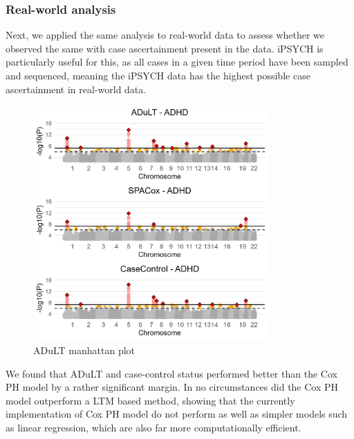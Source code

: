 \subsubsection{Real-world analysis}
Next, we applied the same analysis to real-world data to assess whether we observed the same with case ascertainment present in the data. iPSYCH is particularly useful for this, as all cases in a given time period have been sampled and sequenced, meaning the iPSYCH data has the highest possible case ascertainment in real-world data. 

\begin{figure}
	\label{fig:adult_ADHD}
	\caption{ADuLT manhattan plot}
	\includegraphics[width=9cm]{results/adult_manhattanPlot_ADHD}
\end{figure}
We found that ADuLT and case-control status performed better than the Cox PH model by a rather significant margin. In no circumstances did the Cox PH model outperform a LTM based method, showing that the currently implementation of Cox PH model do not perform as well as simpler models such as linear regression, which are also far more computationally efficient.

